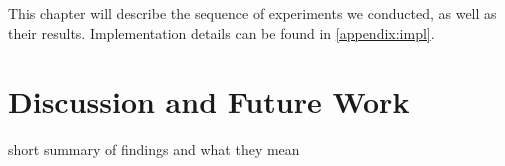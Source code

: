 \documentclass{report}
\theoremstyle{definition}
\theoremstyle{plain}
\begin{document}
This chapter will describe the sequence of experiments we conducted, as well as their results. Implementation details can be found in \ref{appendix:impl}. 













%
%

\chapter{Discussion and Future Work}

short summary of findings and what they mean



%
% 
\end{document}

